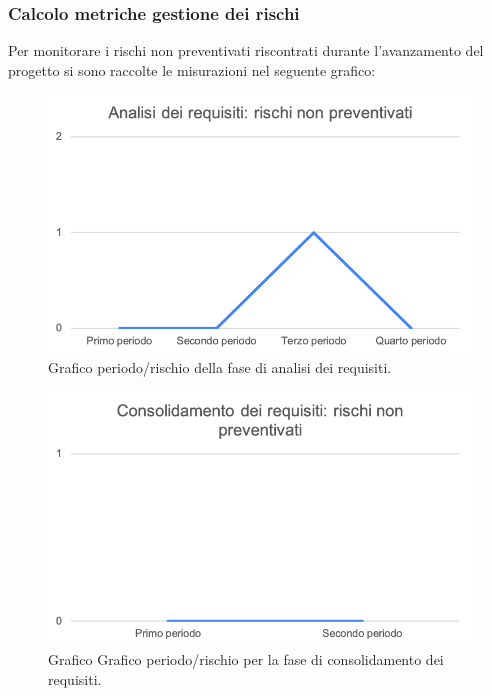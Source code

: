 \subsubsection{Calcolo metriche gestione dei rischi}
Per monitorare i rischi non preventivati riscontrati durante l'avanzamento del progetto si sono raccolte le misurazioni nel seguente grafico:

	\begin{figure}[H]
		\centering
		\includegraphics[width=0.8\linewidth]{./res/images/RischiNonPrevent_1.png}
		\caption{Grafico periodo/rischio della fase di analisi dei requisiti.}
		\label{fig:Grafico periodo/rischio nel periodo di analisi dei requisiti.}
	\end{figure}

	\begin{figure}[H]
			\centering
			\includegraphics[width=0.8\linewidth]{./res/images/RischiNonPrevent_2.png}
			\caption{Grafico Grafico periodo/rischio per la fase di consolidamento dei requisiti.}
			\label{fig:Grafico periodo/rischio per la fase di consolidamento dei requisiti.}
	\end{figure}

